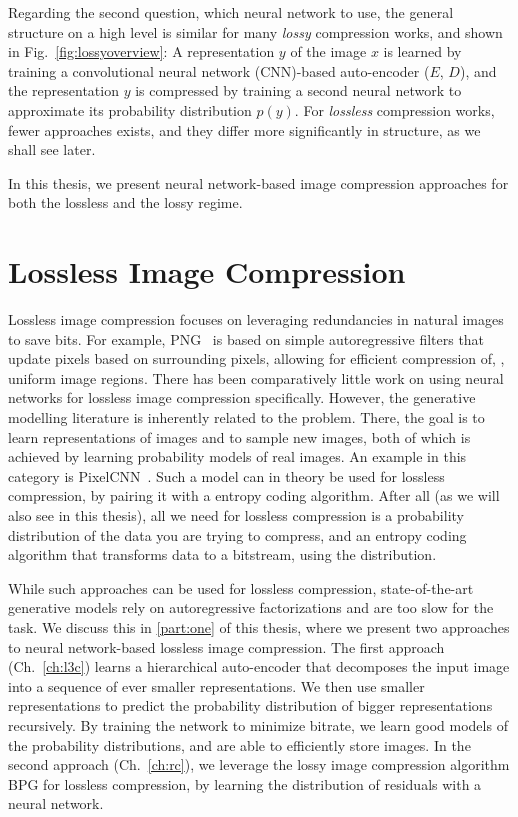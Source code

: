 Regarding the second question, which neural network to use, the general structure
on a high level is similar for many
\emph{lossy} compression works, and shown in Fig.~\ref{fig:lossyoverview}: A
representation $y$ of the image $x$ is learned by training a convolutional
neural network (CNN)-based auto-encoder ($E$, $D$), and the representation $y$ is compressed
by training a second neural network to approximate its probability distribution
$p(y)$.  For \emph{lossless} compression works, fewer
approaches exists, and they differ more significantly in structure, as we shall
see later.

In this thesis, we present neural network-based image compression approaches for
both the lossless and the lossy regime.

\section{Lossless Image Compression}

Lossless image compression focuses on 
leveraging redundancies in natural images to save bits.
For example, PNG~\cite{pngurl} is based on simple autoregressive
filters that update pixels based on surrounding pixels, allowing for efficient
compression of, \eg, uniform image regions. There has been comparatively little
work on using neural networks for lossless image compression specifically.
However, the generative modelling literature is inherently related to the
problem. There, the goal is to learn representations of images and to sample
new images, both of which is achieved by learning probability models of real
images. An example in this category is PixelCNN~\cite{van2016pixel}. Such a
model can in theory be used for lossless compression, by pairing it with a
entropy coding algorithm. After all (as we will also see in this thesis), all
we need for lossless compression is a probability distribution of the data you
are trying to compress, and an entropy coding algorithm that transforms data to
a bitstream, using the distribution. 

While such approaches can be used for lossless compression,
state-of-the-art generative models rely on autoregressive factorizations and
are too slow for the task.  We discuss this in \ref{part:one} of this thesis,
where we present two approaches to neural network-based lossless image
compression. The first approach (Ch.~\ref{ch:l3c}) learns a hierarchical
auto-encoder that decomposes the input image into a sequence of ever smaller
representations. We then use smaller representations to predict the probability
distribution of bigger representations recursively. By training the network to
minimize bitrate, we learn good models of the probability distributions, and are able to
efficiently store images. In the second approach (Ch.~\ref{ch:rc}), we leverage
the lossy image compression algorithm BPG for lossless compression, by learning
the distribution of residuals with a neural network.

